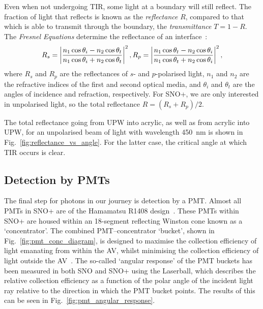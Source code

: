 Even when not undergoing TIR, some light at a boundary will still reflect. The fraction of light that reflects is known as the \textit{reflectance} $R$, compared to that which is able to transmit through the boundary, the \textit{transmittance} $T=1-R$. The \textit{Fresnel Equations} determine the reflectance of an interface~\cite{hechtSectionFresnelEquations2014}:%
\begin{equation}
    R_{s} = \left|\frac{n_{1}\cos{\theta_{i}}-n_{2}\cos{\theta_{t}}}{n_{1}\cos{\theta_{i}}+n_{2}\cos{\theta_{t}}}\right|^{2},\\
    R_{p} = \left|\frac{n_{1}\cos{\theta_{t}}-n_{2}\cos{\theta_{i}}}{n_{1}\cos{\theta_{t}}+n_{2}\cos{\theta_{i}}}\right|^{2},
\end{equation}
where $R_{s}$ and $R_{p}$ are the reflectances of $s$- and $p$-polarised light, $n_{1}$ and $n_{2}$ are the refractive indices of the first and second optical media, and $\theta_{i}$ and $\theta_{t}$ are the angles of incidence and refraction, respectively. For SNO+, we are only interested in unpolarised light, so the total reflectance $R = \left(R_{s}+R_{p}\right)/2$.

The total reflectance going from UPW into acrylic, as well as from acrylic into UPW, for an unpolarised beam of light with wavelength \SI{450}{\nm} is shown in Fig.~\ref{fig:reflectance_vs_angle}. For the latter case, the critical angle at which TIR occurs is clear.

\subsection{Detection by PMTs}\label{sec:pmts}
The final step for photons in our journey is detection by a PMT. Almost all PMTs in SNO+ are of the Hamamatsu R1408 design~\cite{BOGER2000172}. %
These PMTs within SNO+ are housed within an 18-segment reflecting Winston cone known as a `concentrator'. The combined PMT--concentrator `bucket', shown in Fig.~\ref{fig:pmt_conc_diagram}, is designed to maximise the collection efficiency of light emanating from within the AV, whilst minimising the collection efficiency of light outside the AV~\cite{moorheadReflectorsCherenkovDetectors1992}. %
The so-called `angular response' of the PMT buckets has been measured in both SNO and SNO+ using the Laserball, which describes the relative collection efficiency as a function of the polar angle of the incident light ray relative to the direction in which the PMT bucket points. The results of this can be seen in Fig.~\ref{fig:pmt_angular_response}.

